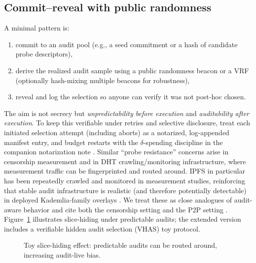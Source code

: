 \documentclass[11pt]{article}
\begin{document}
\subsection{Commit--reveal with public randomness}
A minimal pattern is:
\begin{enumerate}
\item commit to an audit pool (e.g., a seed commitment or a hash of candidate probe descriptors),
\item derive the realized audit sample using a public randomness beacon \cite{drand_spec,cloudflare_randomness_beacon_2025,nist_beacon,nist_ir8213_2019} or a VRF \cite{micali1999vrf} (optionally hash-mixing multiple beacons for robustness),
\item reveal and log the selection so anyone can verify it was not post-hoc chosen.
\end{enumerate}
The aim is not secrecy but \emph{unpredictability before execution} and \emph{auditability after execution}.
To keep this verifiable under retries and selective disclosure, treat each initiated selection attempt (including aborts) as a notarized, log-appended manifest entry, and budget restarts with the $\delta$-spending discipline in the companion notarization note \cite{series:evalnotary}.
Similar ``probe resistance'' concerns arise in censorship measurement and in DHT crawling/monitoring infrastructure, where measurement traffic can be fingerprinted and routed around.
IPFS in particular has been repeatedly crawled and monitored in measurement studies, reinforcing that stable audit infrastructure is realistic (and therefore potentially detectable) in deployed Kademlia-family overlays \cite{henningsen2020mapping_ipfs,daniel2022ipfs_churn}.
We treat these as close analogues of audit-aware behavior and cite both the censorship setting and the P2P setting \cite{ensafi2015gfw,deresistor2023,steiner2007kad,wolchok2010dhtcrawl}.
Figure~\ref{fig:slice_hiding} illustrates slice-hiding under predictable audits; the extended version includes a verifiable hidden audit selection (VHAS) toy protocol.

\begin{figure}[t]
\centering
{}
\caption{Toy slice-hiding effect: predictable audits can be routed around, increasing audit-live bias.}
\label{fig:slice_hiding}
\end{figure}
\end{document}

